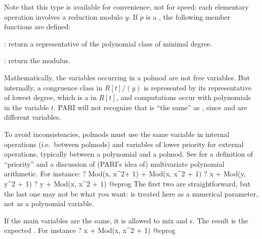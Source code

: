 Note that this type is available for convenience, not for speed: each
elementary operation involves a reduction modulo $y$.
If $p$ is a , the following member functions are defined:

: return a representative of the polynomial class of minimal degree.

: return the modulus.

\label{se:rempolmod}
Mathematically, the variables occurring in a polmod are not
free variables. But internally, a congruence class in $R[t]/(y)$ is
represented by its representative  of lowest degree, which is a  in
$R[t]$, and computations occur with polynomials in the variable $t$. PARI
will not recognize that  is ``the same'' as
, since  and  are different variables.

To avoid inconsistencies, polmods must use the same variable in internal
operations (i.e.~between polmods) and variables of lower priority for
external operations, typically between a polynomial and a polmod. See
 for a definition of ``priority'' and a discussion of
(PARI's idea of) multivariate polynomial arithmetic.
For instance:
\bprog
    ? Mod(x, x^2+ 1) + Mod(x, x^2 + 1)
    ? x + Mod(y, y^2 + 1)
    ? y + Mod(x, x^2 + 1)
@eprog\noindent
The first two are straightforward, but the last one may not be what you
want:  is treated here as a numerical parameter, not as a polynomial
variable.

If the main variables are the same, it is allowed to mix  and
s. The result is the expected . For instance
\bprog
    ? x + Mod(x, x^2 + 1)
@eprog

